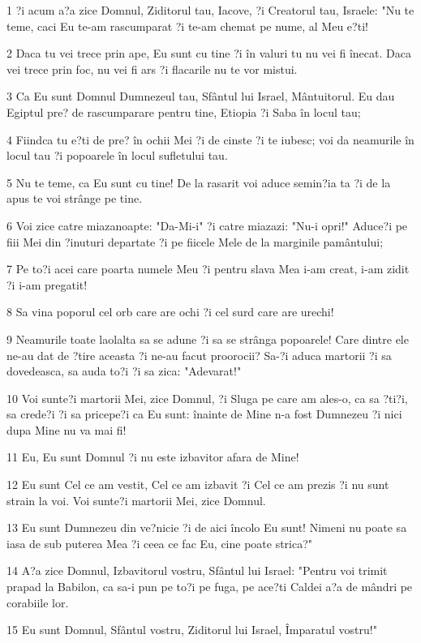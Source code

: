 \par 1 ?i acum a?a zice Domnul, Ziditorul tau, Iacove, ?i Creatorul tau, Israele: "Nu te teme, caci Eu te-am rascumparat ?i te-am chemat pe nume, al Meu e?ti!
\par 2 Daca tu vei trece prin ape, Eu sunt cu tine ?i în valuri tu nu vei fi înecat. Daca vei trece prin foc, nu vei fi ars ?i flacarile nu te vor mistui.
\par 3 Ca Eu sunt Domnul Dumnezeul tau, Sfântul lui Israel, Mântuitorul. Eu dau Egiptul pre? de rascumparare pentru tine, Etiopia ?i Saba în locul tau;
\par 4 Fiindca tu e?ti de pre? în ochii Mei ?i de cinste ?i te iubesc; voi da neamurile în locul tau ?i popoarele în locul sufletului tau.
\par 5 Nu te teme, ca Eu sunt cu tine! De la rasarit voi aduce semin?ia ta ?i de la apus te voi strânge pe tine.
\par 6 Voi zice catre miazanoapte: "Da-Mi-i" ?i catre miazazi: "Nu-i opri!" Aduce?i pe fiii Mei din ?inuturi departate ?i pe fiicele Mele de la marginile pamântului;
\par 7 Pe to?i acei care poarta numele Meu ?i pentru slava Mea i-am creat, i-am zidit ?i i-am pregatit!
\par 8 Sa vina poporul cel orb care are ochi ?i cel surd care are urechi!
\par 9 Neamurile toate laolalta sa se adune ?i sa se strânga popoarele! Care dintre ele ne-au dat de ?tire aceasta ?i ne-au facut proorocii? Sa-?i aduca martorii ?i sa dovedeasca, sa auda to?i ?i sa zica: "Adevarat!"
\par 10 Voi sunte?i martorii Mei, zice Domnul, ?i Sluga pe care am ales-o, ca sa ?ti?i, sa crede?i ?i sa pricepe?i ca Eu sunt: înainte de Mine n-a fost Dumnezeu ?i nici dupa Mine nu va mai fi!
\par 11 Eu, Eu sunt Domnul ?i nu este izbavitor afara de Mine!
\par 12 Eu sunt Cel ce am vestit, Cel ce am izbavit ?i Cel ce am prezis ?i nu sunt strain la voi. Voi sunte?i martorii Mei, zice Domnul.
\par 13 Eu sunt Dumnezeu din ve?nicie ?i de aici încolo Eu sunt! Nimeni nu poate sa iasa de sub puterea Mea ?i ceea ce fac Eu, cine poate strica?"
\par 14 A?a zice Domnul, Izbavitorul vostru, Sfântul lui Israel: "Pentru voi trimit prapad la Babilon, ca sa-i pun pe to?i pe fuga, pe ace?ti Caldei a?a de mândri pe corabiile lor.
\par 15 Eu sunt Domnul, Sfântul vostru, Ziditorul lui Israel, Împaratul vostru!"
